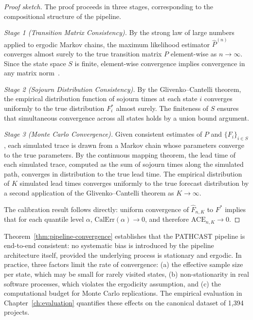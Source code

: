 \begin{proof}[Proof sketch]
The proof proceeds in three stages, corresponding to the compositional
structure of the pipeline.

\textit{Stage 1 (Transition Matrix Consistency).} By the strong law of
large numbers applied to ergodic Markov chains, the maximum likelihood
estimator $\hat{P}^{(n)}$ converges almost surely to the true transition
matrix $P$ element-wise as $n \to \infty$. Since the state space $S$ is
finite, element-wise convergence implies convergence in any matrix
norm~\cite{billingsley1961statistical}.

\textit{Stage 2 (Sojourn Distribution Consistency).} By the
Glivenko--Cantelli theorem, the empirical distribution function of sojourn
times at each state $i$ converges uniformly to the true distribution
$F_i^*$ almost surely. The finiteness of $S$ ensures that simultaneous
convergence across all states holds by a union bound argument.

\textit{Stage 3 (Monte Carlo Convergence).} Given consistent estimates of
$P$ and $\{F_i\}_{i \in S}$, each simulated trace is drawn from a Markov
chain whose parameters converge to the true parameters. By the continuous
mapping theorem, the lead time of each simulated trace, computed as the
sum of sojourn times along the simulated path, converges in distribution
to the true lead time. The empirical distribution of $K$ simulated lead
times converges uniformly to the true forecast distribution by a second
application of the Glivenko--Cantelli theorem as $K \to \infty$.

The calibration result follows directly: uniform convergence of
$\hat{F}_{n,K}$ to $F^*$ implies that for each quantile level $\alpha$,
$\text{CalErr}(\alpha) \to 0$, and therefore
$\text{ACE}_{n,K} \to 0$.
\end{proof}

\begin{remark}
\label{rem:convergence-practical}
Theorem~\ref{thm:pipeline-convergence} establishes that the PATHCAST
pipeline is end-to-end consistent: no systematic bias is introduced by
the pipeline architecture itself, provided the underlying process is
stationary and ergodic. In practice, three factors limit the rate of
convergence: (a) the effective sample size per state, which may be small
for rarely visited states, (b) non-stationarity in real software
processes, which violates the ergodicity assumption, and (c) the
computational budget for Monte Carlo replications. The empirical
evaluation in Chapter~\ref{ch:evaluation} quantifies these effects on the
canonical dataset of 1{,}394 projects.
\end{remark}


